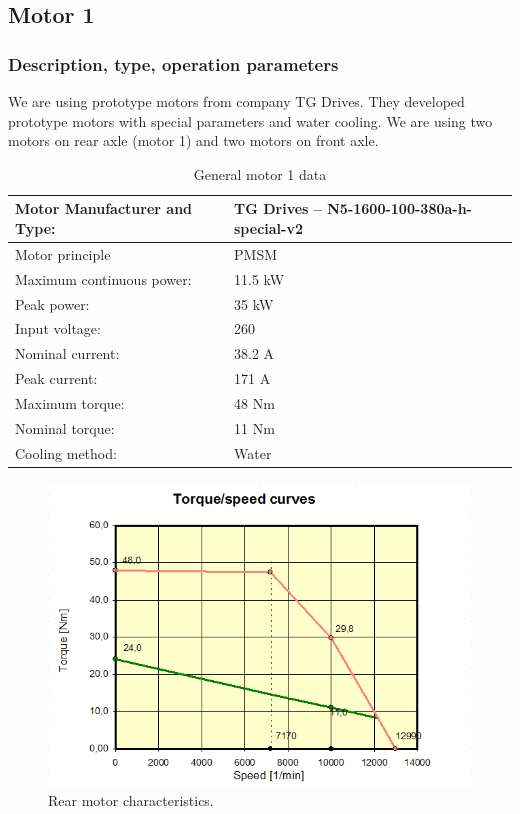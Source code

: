\subsection{Motor 1}

\subsubsection{Description, type, operation parameters}

We are using prototype motors from company TG Drives. They developed prototype motors with special parameters and water cooling. We are using two motors on rear axle (motor 1) and two motors on front axle.
\begin{table}[H]
	\centering
	\caption{General motor 1 data}
	\begin{tabu}{|X|X|}\hline
		Motor Manufacturer and Type: & TG Drives – N5-1600-100-380a-h-special-v2 \\\hline
		Motor principle & PMSM \\\hline
		Maximum continuous power: & 11.5 kW \\\hline
		Peak power: & 35 kW \\\hline
		Input voltage: & 260 \vac \\\hline
		Nominal current: & 38.2 A \\\hline
		Peak current: & 171 A \\\hline
		Maximum torque: & 48 Nm \\\hline
		Nominal torque: & 11 Nm \\\hline
		Cooling method: & Water \\\hline
	\end{tabu}%
	\label{tab:motors1-general}%
\end{table}%

\begin{figure}[H]
	\centering
	\includegraphics[width=\textwidth]{./img/MOTOR1-torque.png}
	\caption{Rear motor characteristics.}
	\label{fig:torque1}
\end{figure}

